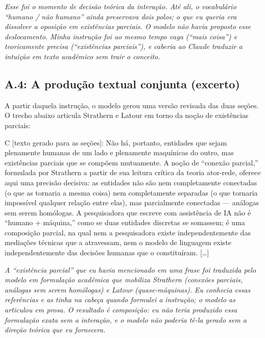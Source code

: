 \noindent\emph{Esse foi o momento de decisão teórica da interação. Até ali, o vocabulário ``humano / não humano'' ainda preservava dois polos; o que eu queria era dissolver a oposição em existências parciais. O modelo não havia proposto esse deslocamento. Minha instrução foi ao mesmo tempo vaga (``mais coisa'') e teoricamente precisa (``existências parciais''), e caberia ao Claude traduzir a intuição em texto acadêmico sem trair o conceito.}

\bigskip

\subsection*{A.4: A produção textual conjunta (excerto)}

A partir daquela instrução, o modelo gerou uma versão revisada das duas seções. O trecho abaixo articula Strathern e Latour em torno da noção de existências parciais:

\begin{faladaC}
C [texto gerado para as seções]: Não há, portanto, entidades que sejam plenamente humanas de um lado e plenamente maquínicas do outro, mas existências parciais que se compõem mutuamente. A noção de ``conexão parcial,'' formulada por Strathern a partir de sua leitura crítica da teoria ator-rede, oferece aqui uma precisão decisiva: as entidades não são nem completamente conectadas (o que as tornaria a mesma coisa) nem completamente separadas (o que tornaria impossível qualquer relação entre elas), mas parcialmente conectadas --- análogas sem serem homólogas. A pesquisadora que escreve com assistência de IA não é ``humano + máquina,'' como se duas entidades discretas se somassem; é uma composição parcial, na qual nem a pesquisadora existe independentemente das mediações técnicas que a atravessam, nem o modelo de linguagem existe independentemente das decisões humanas que o constituíram. [\ldots]
\end{faladaC}

\noindent\emph{A ``existência parcial'' que eu havia mencionado em uma frase foi traduzida pelo modelo em formulação acadêmica que mobiliza Strathern (conexões parciais, análogas sem serem homólogas) e Latour (quase-máquinas). Eu conhecia essas referências e as tinha na cabeça quando formulei a instrução; o modelo as articulou em prosa. O resultado é composição: eu não teria produzido essa formulação exata sem a interação, e o modelo não poderia tê-la gerado sem a direção teórica que eu fornecera.}


